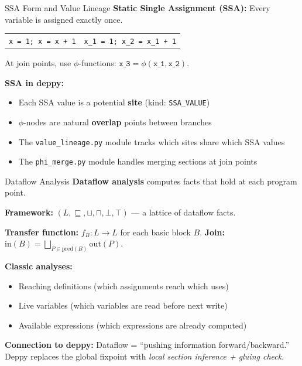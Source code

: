 \documentclass[aspectratio=169,10pt]{beamer}
\begin{document}
\begin{frame}{SSA Form and Value Lineage}
\textbf{Static Single Assignment (SSA):} Every variable is assigned exactly once.

\begin{center}
\begin{tabular}{@{}l@{\qquad$\to$\qquad}l@{}}
\texttt{x = 1; x = x + 1} & \texttt{x\_1 = 1; x\_2 = x\_1 + 1}
\end{tabular}
\end{center}

At join points, use $\phi$-functions: $\texttt{x\_3} = \phi(\texttt{x\_1}, \texttt{x\_2})$.

\vspace{0.3em}
\textbf{SSA in deppy:}
\begin{itemize}
  \item Each SSA value is a potential \textbf{site} (kind: \texttt{SSA\_VALUE})
  \item $\phi$-nodes are natural \textbf{overlap} points between branches
  \item The \texttt{value\_lineage.py} module tracks which sites share which SSA values
  \item The \texttt{phi\_merge.py} module handles merging sections at join points
\end{itemize}
\end{frame}

\begin{frame}{Dataflow Analysis}
\textbf{Dataflow analysis} computes facts that hold at each program point.

\textbf{Framework:} $(L, \sqsubseteq, \sqcup, \sqcap, \bot, \top)$ --- a lattice of dataflow facts.

\vspace{0.3em}
\textbf{Transfer function:} $f_B : L \to L$ for each basic block $B$.
\textbf{Join:} $\text{in}(B) = \bigsqcup_{P \in \text{pred}(B)} \text{out}(P)$.

\vspace{0.5em}
\textbf{Classic analyses:}
\begin{itemize}
  \item Reaching definitions (which assignments reach which uses)
  \item Live variables (which variables are read before next write)
  \item Available expressions (which expressions are already computed)
\end{itemize}

\vspace{0.3em}
\textbf{Connection to deppy:} Dataflow = ``pushing information forward/backward.'' Deppy replaces the global fixpoint with \emph{local section inference + gluing check}.
\end{frame}
\end{document}
